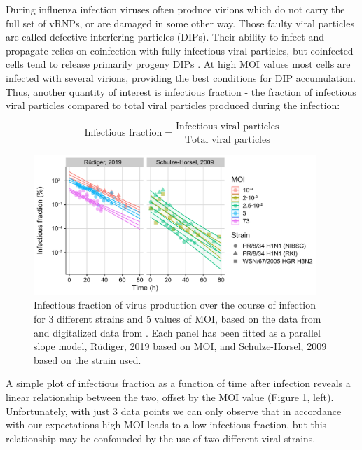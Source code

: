 During influenza infection viruses often produce virions which do not carry the full set of vRNPs, or are damaged in some other way. Those faulty viral particles are called defective interfering particles (DIPs). Their ability to infect and propagate relies on coinfection with fully infectious viral particles, but coinfected cells tend to release primarily progeny DIPs \cite{frensing2014impact}. At high MOI values most cells are infected with several virions, providing the best conditions for DIP accumulation. Thus, another quantity of interest is infectious fraction - the fraction of infectious viral particles compared to total viral particles produced during the infection:

\begin{equation}
    \text{Infectious fraction} = \frac{\text{Infectious viral particles}}{\text{Total viral particles}}
\end{equation}

\begin{figure}
\begin{center}
\includegraphics[width=0.95\textwidth, trim={0cm 0cm 0cm 0cm}, clip]{D_chapters/3_DARPinModels/InfectiousFractionAll.pdf}
\caption[Infectious fraction of virus production over the course of infection]%
{Infectious fraction of virus production over the course of infection for 3 different strains and 5 values of MOI, based on the data from \cite{frensing2016influenza, rudiger2019multiscale} and digitalized data from \cite{schulze2009infection}. Each panel has been fitted as a parallel slope model, R\"udiger, 2019 \cite{rudiger2019multiscale} based on MOI, and Schulze-Horsel, 2009 \cite{schulze2009infection} based on the strain used.}
\label{figure:infectiousFraction}
\end{center}
\end{figure}

A simple plot of infectious fraction \cite{rudiger2019multiscale, frensing2016influenza} as a function of time after infection reveals a linear relationship between the two, offset by the MOI value (Figure \ref{figure:infectiousFraction}, left). Unfortunately, with just 3 data points we can only observe that in accordance with our expectations high MOI leads to a low infectious fraction, but this relationship may be confounded by the use of two different viral strains.

